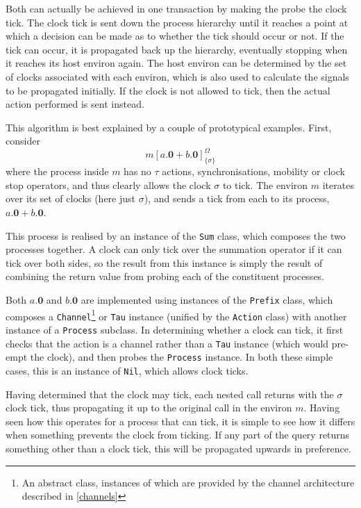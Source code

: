 \documentclass{sig-alternate}
\newcommand{\nil}{\textbf{0}}
\newcommand{\loc}[4]{{#1}[ #2 ]^{#3}_{\{#4\}}}
\begin{document}
Both can actually be achieved in one transaction by making the probe the
clock tick.  The clock tick is sent down the process hierarchy until it
reaches a point at which a decision can be made as to whether the tick
should occur or not.  If the tick can occur, it is propagated back up
the hierarchy, eventually stopping when it reaches its host environ
again.  The host environ can be determined by the set of clocks
associated with each environ, which is also used to calculate the
signals to be propagated initially.  If the clock is not allowed to
tick, then the actual action performed is sent instead.

This algorithm is best explained by a couple of prototypical examples.
First, consider 
\begin{displaymath}
\loc{m}{a.\nil + b.\nil}{\Omega}{\sigma}
\end{displaymath}
where the process inside $m$ has no $\tau$ actions, synchronisations,
mobility or clock stop operators, and thus clearly allows the clock
$\sigma$ to tick.  The environ $m$ iterates over its set of clocks (here
just $\sigma$), and sends a tick from each to its process, $a.\nil +
b.\nil$.

This process is realised by an instance of the \texttt{Sum} class, which
composes the two processes together.  A clock can only tick over the
summation operator if it can tick over both sides, so the result from
this instance is simply the result of combining the return value from
probing each of the constituent processes.

Both $a.\nil$ and $b.\nil$ are implemented using instances of the
\texttt{Prefix} class, which composes a \texttt{Channel}\footnote{An
abstract class, instances of which are provided by the channel
architecture described in \ref{channels}} or \texttt{Tau} instance
(unified by the \texttt{Action} class) with another instance of a
\texttt{Process} subclass.  In determining whether a clock can tick, it
first checks that the action is a channel rather than a \texttt{Tau}
instance (which would pre-empt the clock), and then probes the
\texttt{Process} instance.  In both these simple cases, this is an
instance of \texttt{Nil}, which allows clock ticks.

Having determined that the clock may tick, each nested call returns with
the $\sigma$ clock tick, thus propagating it up to the original call in
the environ $m$.  Having seen how this operates for a process that can
tick, it is simple to see how it differs when something prevents the
clock from ticking.  If any part of the query returns something other
than a clock tick, this will be propagated upwards in preference.
\end{document}
